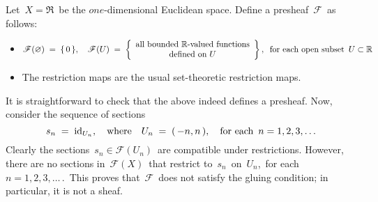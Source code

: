 
\vskip 0.5cm
\begin{example}
\mbox{}\vskip 0.1cm
\noindent
Let \,$X = \Re$\, be the $one$-dimensional Euclidean space.
Define a presheaf \,$\mathscr{F}$\, as follows:
\begin{itemize}
\item
	$
	\mathscr{F}(\varnothing) \;=\; \{\,0\,\},
	\quad
	\mathscr{F}(U) \;=\; \left\{\begin{array}{c}
		\textnormal{all bounded $\mathbb{R}$-valued functions}
		\\
		\textnormal{defined on $U$}
		\end{array}\right\},
		\;\;\textnormal{for each open subset \,$U \subset \mathbb{R}$}
	$
\item
	The restriction maps are the usual set-theoretic restriction maps.
\end{itemize}
It is straightforward to check that the above indeed defines a presheaf.
Now, consider the sequence of sections
\begin{equation*}
s_{n} \;=\; \textnormal{id}_{U_{n}},
\quad\textnormal{where}\quad 
U_{n} \;=\; (\,-n,n\,),
\quad\textnormal{for each \,$n = 1, 2, 3, \ldots$}
\end{equation*}
Clearly the sections \,$s_{n} \in \mathscr{F}(U_{n})$\, are compatible under restrictions.
However, there are no sections in \,$\mathscr{F}(X)$\, that restrict to \,$s_{n}$\, on \,$U_{n}$,\, for each \,$n = 1, 2, 3, \ldots\,$.\,
This proves that \,$\mathscr{F}$\, does not satisfy the gluing condition; in particular, it is not a sheaf.
\end{example}

